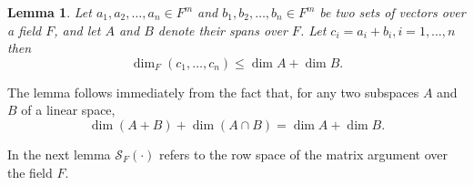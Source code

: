\documentclass[11pt,onecolumn]{IEEEtran}
\newtheorem{lemma}{Lemma}
\newcommand{\cS}{\mathcal{S}}
\begin{document}
\begin{lemma}\label{lem:ez} %
Let $a_1,a_2,\dots,a_n\in F^m$ and $b_1,b_2,\dots,b_n\in F^m$
be two sets of vectors over a field $F$, and let $A$ and $B$ denote their spans over $F$. %
Let $c_i=a_i+b_i, i=1,\dots,n$ then
\begin{equation}\label{eq:plus}
\dim_F(c_1,\dots,c_n) \le \dim A + \dim B.
\end{equation}
\end{lemma}
The lemma follows immediately from the fact that, for any two subspaces $A$ and $B$ of a linear space,
\begin{equation}\label{eq:sumcap}
\dim(A+B)+\dim(A\cap B)=\dim A+\dim B.
\end{equation}
%

In the next lemma $\cS_F(\cdot)$ refers to the row space of the matrix argument over the field $F$.
\end{document}
